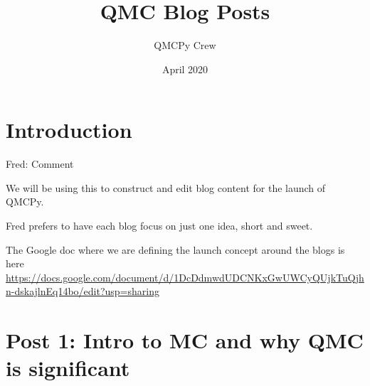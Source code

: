 \documentclass{article}
\title{QMC Blog Posts}
\author{QMCPy Crew}
\date{April 2020}
\newcommand{\FredComment}[1]{{\color{blue} Fred: #1}}
\begin{document}
\maketitle

\setcounter{tocdepth}{1}
\tableofcontents

\section{Introduction}
\FredComment{Comment}

We will be using this to construct and edit blog content for the launch of QMCPy.

Fred prefers to have each blog focus on just one idea, short and sweet.

The Google doc where we are defining the launch concept around the blogs is here \url{https://docs.google.com/document/d/1DcDdmwdUDCNKxGwUWCyQUjkTuQjhn-dskajlnEq14bo/edit?usp=sharing}

\section{Post 1: Intro to MC and why QMC is significant}
\end{document}
